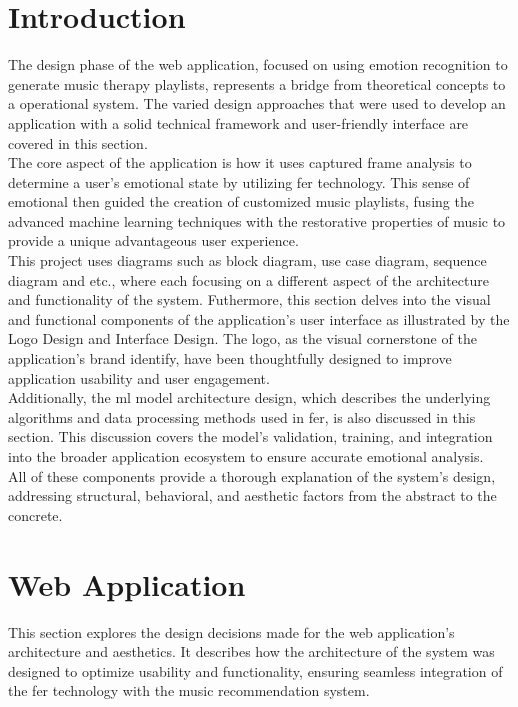 \section{Introduction}
The design phase of the web application, focused on using emotion recognition to generate music therapy playlists, represents a bridge from theoretical concepts to a operational system.
The varied design approaches that were used to develop an application with a solid technical framework and user-friendly interface are covered in this section.
\\
\indent The core aspect of the application is how it uses captured frame analysis to determine a user's emotional state by utilizing \gls{fer} technology.
This sense of emotional then guided the creation of customized music playlists, fusing the advanced machine learning techniques with the restorative properties of music to provide a unique advantageous user experience.
\\
\indent This project uses diagrams such as block diagram, use case diagram, sequence diagram and etc., where each focusing on a different aspect of the architecture and functionality of the system.
Futhermore, this section delves into the visual and functional components of the application's user interface as illustrated by the Logo Design and Interface Design.
The logo, as the visual cornerstone of the application's brand identify, have been thoughtfully designed to improve application usability and user engagement.
\\
\indent Additionally, the \gls{ml} model architecture design, which describes the underlying algorithms and data processing methods used in \gls{fer}, is also discussed in this section.
This discussion covers the model's validation, training, and integration into the broader application ecosystem to ensure accurate emotional analysis.
\\
\indent All of these components provide a thorough explanation of the system's design, addressing structural, behavioral, and aesthetic factors from the abstract to the concrete.

\section{Web Application}
This section explores the design decisions made for the web application's architecture and aesthetics.
It describes how the architecture of the system was designed to optimize usability and functionality, ensuring seamless integration of the \gls{fer} technology with the music recommendation system.
\\
